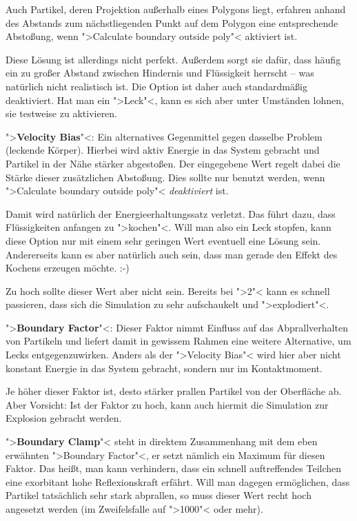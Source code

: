\documentclass[10pt,DIV=14,a4paper]{scrartcl}
\begin{document}
	{Auch Partikel, deren Projektion außerhalb eines Polygons liegt,
	erfahren anhand des Abstands zum nächstliegenden Punkt auf dem
	Polygon eine entsprechende Abstoßung, wenn ">Calculate boundary
	outside poly"< aktiviert ist.}

	Diese Lösung ist allerdings nicht perfekt. Außerdem sorgt sie dafür,
	dass häufig ein zu großer Abstand zwischen Hindernis und Flüssigkeit
	herrscht -- was natürlich nicht realistisch ist. Die Option ist
	daher auch standardmäßig deaktiviert. Hat man ein ">Leck"<, kann es
	sich aber unter Umständen lohnen, sie testweise zu aktivieren.

	\item ">\textbf{Velocity Bias}"<: Ein alternatives Gegenmittel gegen
	dasselbe Problem (leckende Körper). Hierbei wird aktiv Energie in
	das System gebracht und Partikel in der Nähe stärker abgestoßen. Der
	eingegebene Wert regelt dabei die Stärke dieser zusätzlichen
	Abstoßung. Dies sollte nur benutzt werden, wenn ">Calculate boundary
	outside poly"< \emph{deaktiviert} ist.

	Damit wird natürlich der Energieerhaltungssatz verletzt. Das führt
	dazu, dass Flüssigkeiten anfangen zu ">kochen"<. Will man also ein
	Leck stopfen, kann diese Option nur mit einem sehr geringen Wert
	eventuell eine Lösung sein. Andererseits kann es aber natürlich auch
	sein, dass man gerade den Effekt des Kochens erzeugen möchte. :-)

	Zu hoch sollte dieser Wert aber nicht sein. Bereits bei ">2"< kann
	es schnell passieren, dass sich die Simulation zu sehr aufschaukelt
	und ">explodiert"<.

	\item ">\textbf{Boundary Factor}"<: Dieser Faktor nimmt Einfluss auf
	das Abprallverhalten von Partikeln und liefert damit in gewissem
	Rahmen eine weitere Alternative, um Lecks entgegenzuwirken. Anders
	als der ">Velocity Bias"< wird hier aber nicht konstant Energie in
	das System gebracht, sondern nur im Kontaktmoment.

	Je höher dieser Faktor ist, desto stärker prallen Partikel von der
	Oberfläche ab. Aber Vorsicht: Ist der Faktor zu hoch, kann auch
	hiermit die Simulation zur Explosion gebracht werden.

	\item ">\textbf{Boundary Clamp}"< steht in direktem Zusammenhang mit
	dem eben erwähnten ">Boundary Factor"<, er setzt nämlich ein Maximum
	für diesen Faktor. Das heißt, man kann verhindern, dass ein schnell
	auftreffendes Teilchen eine exorbitant hohe Reflexionskraft erfährt.
	Will man dagegen ermöglichen, dass Partikel tatsächlich sehr stark
	abprallen, so muss dieser Wert recht hoch angesetzt werden (im
	Zweifelsfalle auf ">1000"< oder mehr).
\end{document}
